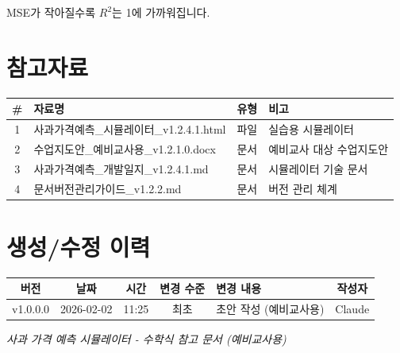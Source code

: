 \documentclass[11pt,a4paper]{article}
\begin{document}
MSE가 작아질수록 $R^2$는 1에 가까워집니다.

\section{ 참고자료}

\begin{center}
\begin{tabular}{|c|l|c|l|}
\hline
\textbf{\#} & \textbf{자료명} & \textbf{유형} & \textbf{비고} \\
\hline
1 & 사과가격예측\_시뮬레이터\_v1.2.4.1.html & 파일 & 실습용 시뮬레이터 \\
\hline
2 & 수업지도안\_예비교사용\_v1.2.1.0.docx & 문서 & 예비교사 대상 수업지도안 \\
\hline
3 & 사과가격예측\_개발일지\_v1.2.4.1.md & 문서 & 시뮬레이터 기술 문서 \\
\hline
4 & 문서버전관리가이드\_v1.2.2.md & 문서 & 버전 관리 체계 \\
\hline
\end{tabular}
\end{center}

\section{ 생성/수정 이력}

\begin{center}
\begin{tabular}{|c|c|c|c|l|c|}
\hline
\textbf{버전} & \textbf{날짜} & \textbf{시간} & \textbf{변경 수준} & \textbf{변경 내용} & \textbf{작성자} \\
\hline
v1.0.0.0 & 2026-02-02 & 11:25 & 최초 & 초안 작성 (예비교사용) & Claude \\
\hline
\end{tabular}
\end{center}

\vspace{1cm}
\begin{center}
\textit{ 사과 가격 예측 시뮬레이터 - 수학식 참고 문서 (예비교사용)}
\end{center}
\end{document}

